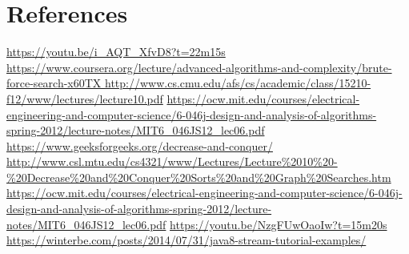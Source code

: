 \documentclass[12pt]{report}
\begin{document}
\section*{References}
\url{https://youtu.be/i_AQT_XfvD8?t=22m15s}
\newline
\newline
\url{https://www.coursera.org/lecture/advanced-algorithms-and-complexity/brute-force-search-x60TX }
\newline
\newline
\url{http://www.cs.cmu.edu/afs/cs/academic/class/15210-f12/www/lectures/lecture10.pdf}
\newline
\newline
\url{https://ocw.mit.edu/courses/electrical-engineering-and-computer-science/6-046j-design-and-analysis-of-algorithms-spring-2012/lecture-notes/MIT6_046JS12_lec06.pdf}
\newline
\newline
\url{https://www.geeksforgeeks.org/decrease-and-conquer/}
\newline
\newline
\url{http://www.csl.mtu.edu/cs4321/www/Lectures/Lecture\%2010\%20-\%20Decrease\%20and\%20Conquer\%20Sorts\%20and\%20Graph\%20Searches.htm}
\newline
\newline
\url{https://ocw.mit.edu/courses/electrical-engineering-and-computer-science/6-046j-design-and-analysis-of-algorithms-spring-2012/lecture-notes/MIT6_046JS12_lec06.pdf}
\newline
\newline
\url{https://youtu.be/NzgFUwOaoIw?t=15m20s}
\newline
\newline
\url{https://winterbe.com/posts/2014/07/31/java8-stream-tutorial-examples/}
\end{document}

